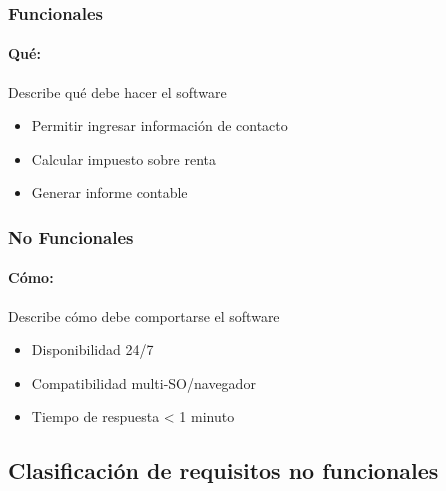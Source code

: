     \subsubsection{Funcionales}\label{subsubsec:requisitos-funcionales}

    \paragraph{Qué:} Describe qué debe hacer el software

    \begin{exemplo}
        \begin{itemize}
            \item Permitir ingresar información de contacto

            \item Calcular impuesto sobre renta

            \item Generar informe contable
        \end{itemize}
    \end{exemplo}

    \subsubsection{No Funcionales}

    \paragraph{Cómo:} Describe cómo debe comportarse el software

    \begin{exemplo}
        \begin{itemize}
            \item Disponibilidad 24/7

            \item Compatibilidad multi-SO/navegador

            \item Tiempo de respuesta < 1 minuto
        \end{itemize}
    \end{exemplo}

    \subsection{Clasificación de requisitos no funcionales}\label{subsec:clasificacion-de-requisitos-no-funcionales}

